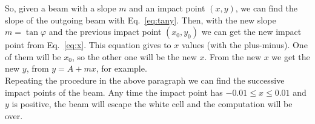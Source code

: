\documentclass[english]{article}
\begin{document}
So, given a beam with a slope $m$ and an impact point $(x,y)$, we can find the slope of the outgoing beam with Eq.~\ref{eq:tany}. Then, with the new slope $m = \tan\varphi$ and the previous impact point $(x_0,y_0)$ we can get the new impact point from Eq.~\ref{eq:x}. This equation gives to $x$ values (with the plus-minus). One of them will be $x_0$, so the other one will be the new $x$. From the new $x$ we get the new $y$, from $y = A + mx$, for example.\\

Repeating the procedure in the above paragraph we can find the successive impact points of the beam. Any time the impact point has $-0.01 \leq x \leq 0.01$ and $y$ is positive, the beam will escape the white cell and the computation will be over.
\end{document}
